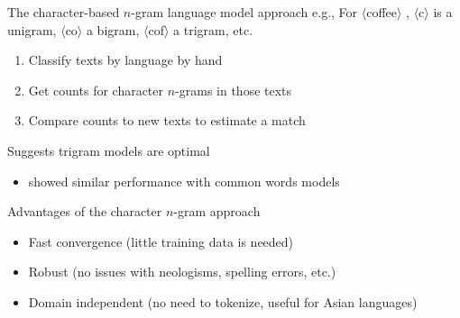 \documentclass{beamer}
\newcommand{\orth}[1]{
    $\langle$#1$\rangle$
  }
\begin{document}
      \begin{frame}{\subsix}
        \begin{block}{The character-based $n$-gram language model approach}
          e.g., For \orth{coffee}, \orth{c} is a unigram, \orth{co} a bigram, \orth{cof} a trigram, etc.
          \begin{enumerate}
            \item Classify texts by language by hand
            \item Get counts for character $n$-grams in those texts
            \item Compare counts to new texts to estimate a match
          \end{enumerate}
        \end{block}
        \begin{block}{\textcite{dunning_statistical_1994}}
          Suggests trigram models are optimal
          \begin{itemize}
            \item \textcite{grefenstette_comparing_1995} showed similar performance with common words models
          \end{itemize}
        \end{block}
      \end{frame}

      \begin{frame}{\subsix}
        \begin{block}{Advantages of the character $n$-gram approach}
          \begin{itemize}
            \item Fast convergence (little training data is needed)
            \item Robust (no issues with neologisms, spelling errors, etc.)
            \item Domain independent (no need to tokenize, useful for Asian languages)
          \end{itemize}
        \end{block}
      \end{frame}
\end{document}
